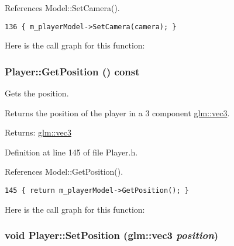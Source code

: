 References Model::SetCamera().

\begin{Code}\begin{verbatim}136 { m_playerModel->SetCamera(camera); }
\end{verbatim}
\end{Code}




Here is the call graph for this function:\hypertarget{class_player_78a1bb11afc7985ce85e93b496d72879}{
\subsubsection[GetPosition]{ Player::GetPosition () const}}
\label{class_player_78a1bb11afc7985ce85e93b496d72879}


Gets the position. 

Returns the position of the player in a 3 component \hyperlink{group__core__types_g1c47e8b3386109bc992b6c48e91b0be7}{glm::vec3}.

\begin{Desc}
\item[Returns:]\hyperlink{group__core__types_g1c47e8b3386109bc992b6c48e91b0be7}{glm::vec3} \end{Desc}


Definition at line 145 of file Player.h.

References Model::GetPosition().

\begin{Code}\begin{verbatim}145 { return m_playerModel->GetPosition(); }
\end{verbatim}
\end{Code}




Here is the call graph for this function:\hypertarget{class_player_2a58860a7169ad27fbb1eec6a64fc31b}{
\subsubsection[SetPosition]{\setlength{\rightskip}{0pt plus 5cm}void Player::SetPosition ({\bf glm::vec3} {\em position})}}
\label{class_player_2a58860a7169ad27fbb1eec6a64fc31b}


